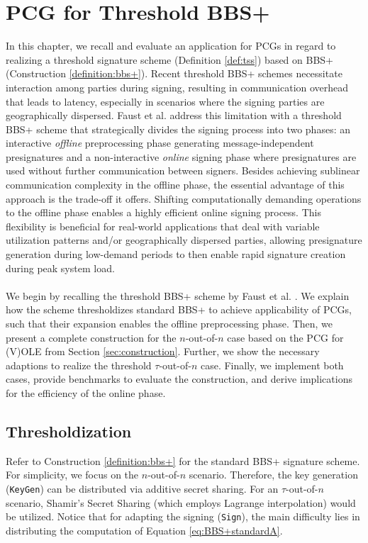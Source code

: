 \chapter{PCG for Threshold BBS+}
In this chapter, we recall and evaluate an application for PCGs in regard to realizing a threshold signature scheme (Definition \ref{def:tss}) based on BBS+ (Construction \ref{definition:bbs+}). Recent threshold BBS+ schemes \cite{doerner2023threshold} necessitate interaction among parties during signing, resulting in communication overhead that leads to latency, especially in scenarios where the signing parties are geographically dispersed. Faust et al. \cite{cryptoeprint:2023/1076} address this limitation with a threshold BBS+ scheme that strategically divides the signing process into two phases: an interactive \textit{offline} preprocessing phase generating message-independent presignatures and a non-interactive \textit{online} signing phase where presignatures are used without further communication between signers. Besides achieving sublinear communication complexity in the offline phase, the essential advantage of this approach is the trade-off it offers. Shifting computationally demanding operations to the offline phase enables a highly efficient online signing process. This flexibility is beneficial for real-world applications that deal with variable utilization patterns and/or geographically dispersed parties, allowing presignature generation during low-demand periods to then enable rapid signature creation during peak system load. 
\\\\
We begin by recalling the threshold BBS+ scheme by Faust et al. \cite{cryptoeprint:2023/1076}. We explain how the scheme thresholdizes standard BBS+ to achieve applicability of PCGs, such that their expansion enables the offline preprocessing phase. Then, we present a complete construction for the $n$-out-of-$n$ case based on the PCG for (V)OLE from Section \ref{sec:construction}. Further, we show the necessary adaptions to realize the threshold $\tau$-out-of-$n$ case. Finally, we implement both cases, provide benchmarks to evaluate the construction, and derive implications for the efficiency of the online phase. 

\section{Thresholdization}
Refer to Construction \ref{definition:bbs+} for the standard BBS+ signature scheme. For simplicity, we focus on the $n$-out-of-$n$ scenario. Therefore, the key generation (\texttt{\textup{KeyGen}}) can be distributed via additive secret sharing. For an $\tau$-out-of-$n$ scenario, Shamir's Secret Sharing  \cite{shamir1979share} (which employs Lagrange interpolation) would be utilized. Notice that for adapting the signing (\texttt{\textup{Sign}}), the main difficulty lies in distributing the computation of Equation \ref{eq:BBS+standardA}.


